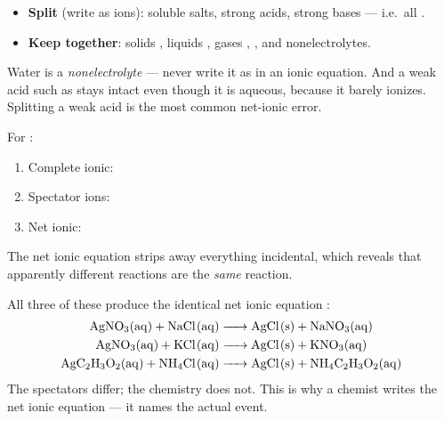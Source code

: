 \documentclass{apchem-notes}
\begin{document}

\begin{itemize}[leftmargin=*,itemsep=0.25em]
  \item \textbf{Split} (write as ions): soluble salts, strong acids, strong
        bases --- i.e.\ all .
  \item \textbf{Keep together}: solids , liquids , gases
        , , and
        nonelectrolytes.
\end{itemize}

\begin{apctrap}
Water is a \emph{nonelectrolyte} --- never write it as  in an
ionic equation. And a weak acid such as  stays intact even
though it is aqueous, because it barely ionizes. Splitting a weak acid is
the most common net-ionic error.
\end{apctrap}


For :
\begin{enumerate}[leftmargin=*,itemsep=0.35em]
  \item Complete ionic: 
  \item Spectator ions: 
  \item Net ionic: 
\end{enumerate}



The net ionic equation strips away everything incidental, which reveals that
apparently different reactions are the \emph{same} reaction.

\begin{workedexample}
All three of these produce the identical net ionic equation
:
\begin{align*}
  \ce{AgNO3(aq) + NaCl(aq) &-> AgCl(s) + NaNO3(aq)}\\
  \ce{AgNO3(aq) + KCl(aq) &-> AgCl(s) + KNO3(aq)}\\
  \ce{AgC2H3O2(aq) + NH4Cl(aq) &-> AgCl(s) + NH4C2H3O2(aq)}
\end{align*}
The spectators differ; the chemistry does not. This is why a chemist writes
the net ionic equation --- it names the actual event.
\end{workedexample}
\end{document}

